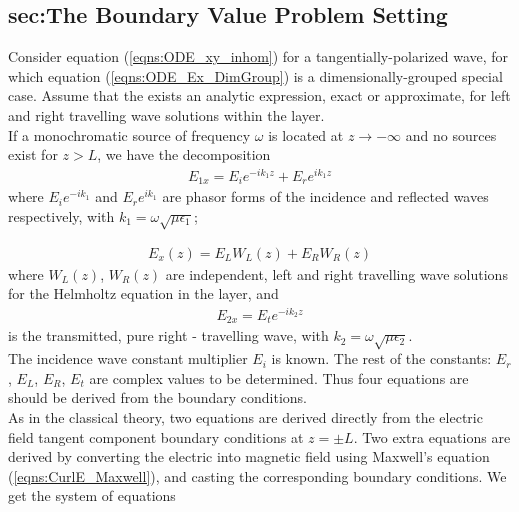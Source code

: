 \documentclass[twocolumn,secnumarabic,amssymb, nobibnotes, aps, prd]{revtex4-1}
\begin{document}
\subsection{sec:The Boundary Value Problem Setting}
Consider equation (\ref{eqns:ODE_xy_inhom}) for a tangentially-polarized wave, for which equation (\ref{eqns:ODE_Ex_DimGroup}) is a dimensionally-grouped special case. Assume that the exists an analytic expression, exact or approximate, for left and right travelling wave solutions within the layer.\\
If a monochromatic source of frequency $\omega$ is located at $z \rightarrow -\infty$ and no sources exist for $z>L$, we have the decomposition
\begin{align}
E_{1x} = E_{i}e^{-i k_1 z} + E_{r}e^{i k_1 z}
\end{align}
where $E_i e^{-i k_1}$ and $E_r e^{i k_1}$ are phasor forms of the incidence and reflected waves respectively, with $k_1 = \omega \sqrt{\mu \epsilon_1}$;

\begin{align}
E_x(z) = E_L W_L(z) + E_R W_R(z)
\end{align}
where $W_L(z)$, $W_R(z)$ are independent, left and right travelling wave solutions for the Helmholtz equation in the layer, and 
\begin{align}
E_{2x} = E_t e^{-i k_2 z}
\end{align}
is the transmitted, pure right - travelling wave, with $k_2 = \omega \sqrt{\mu \epsilon_2}$.\\
The incidence wave constant multiplier $E_i$ is known. The rest of the constants: $E_r$, $E_L$, $E_R$, $E_t$ are complex values to be  determined. Thus four equations are should be derived from the boundary conditions. \\ 
As in the classical theory, two equations are derived directly from the electric field tangent component boundary conditions at $z=\pm L$.  Two extra equations are derived by converting the electric into magnetic field using Maxwell's equation (\ref{eqns:CurlE_Maxwell}),  and casting the corresponding boundary conditions. We get the system of equations
\end{document}
